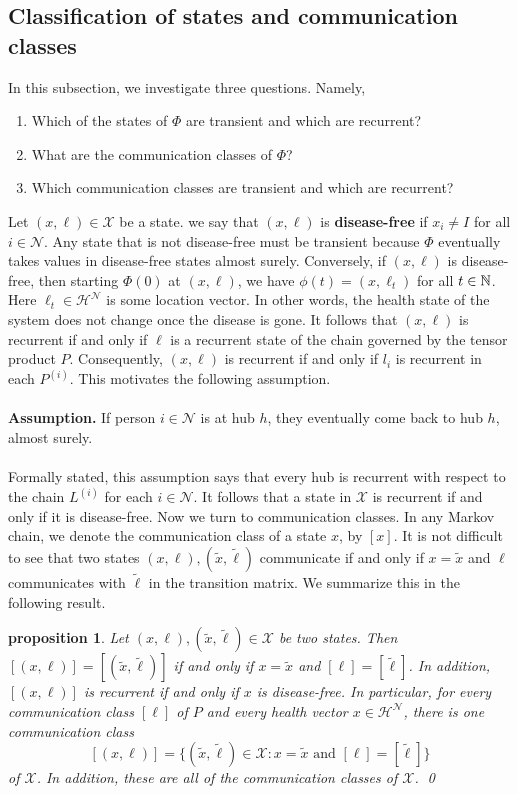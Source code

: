 \documentclass[a4paper]{article}
\newtheorem{prop}[theorem]{proposition}
\begin{document}
	\subsection{Classification of states and communication classes}
	In this subsection, we investigate three questions. Namely,
	\begin{enumerate}
		\item Which of the states of $\Phi$ are transient and which are recurrent?
		\item What are the communication classes of $\Phi$?
		\item Which communication classes are transient and which are recurrent?
	\end{enumerate}
	Let $(x, \ell) \in \mathcal{X}$ be a state. we say that $(x, \ell)$ is \textbf{disease-free} if $x_{i} \neq I$ for all $i \in \mathcal{N}$. Any state that is not disease-free must be transient because $\Phi$ eventually takes values in disease-free states almost surely. Conversely, if $(x, \ell)$ is disease-free, then starting $\Phi(0)$ at $(x, \ell)$, we have $\phi(t) = (x, \ell_{t})$ for all $t \in \mathbb{N}$. Here $\ell_{t} \in \mathcal{H}^{\mathcal{N}}$ is some location vector. In other words, the health state of the system does not change once the disease is gone. It follows that $(x, \ell)$ is recurrent if and only if $\ell$ is a recurrent state of the chain governed by the tensor product $P$. Consequently, $(x, \ell)$ is recurrent if and only if $l_{i}$ is recurrent in each $P^{(i)}$. This motivates the following assumption.\\\\
	\textbf{Assumption.} If person $i \in \mathcal{N}$ is at hub $h$, they eventually come back to hub $h$, almost surely.\\\\
	Formally stated, this assumption says that every hub is recurrent with respect to the chain $L^{(i)}$ for each $i \in \mathcal{N}$. It follows that a state in $\mathcal{X}$ is recurrent if and only if it is disease-free. Now we turn to communication classes. In any Markov chain, we denote the communication class of a state $x$, by $[x]$. It is not difficult to see that two states $(x, \ell), (\tilde{x}, \tilde{\ell})$ communicate if and only if $x = \tilde{x}$ and $\ell$ communicates with $\tilde{\ell}$ in the transition matrix. We summarize this in the following result.
	\begin{prop}
		Let $(x, \ell), (\tilde{x}, \tilde{\ell}) \in \mathcal{X}$ be two states. Then $[(x, \ell)] = [(\tilde{x}, \tilde{\ell})]$ if and only if $x = \tilde{x}$ and $[\ell] =[\tilde{\ell}]$. In addition, $[(x, \ell)]$ is recurrent if and only if $x$ is disease-free. In particular, for every communication class $[\ell]$ of $P$ and every health vector $x \in \mathcal{H}^{\mathcal{N}}$, there is one communication class 
		$$[(x, \ell)] = \{(\tilde{x}, \tilde{\ell}) \in \mathcal{X}: x = \tilde{x} \text{ and } [\ell] = [\tilde{\ell}]\}$$
		of $\mathcal{X}$. In addition, these are all of the communication classes of $\mathcal{X}$. \qed
	\end{prop}
\end{document}
